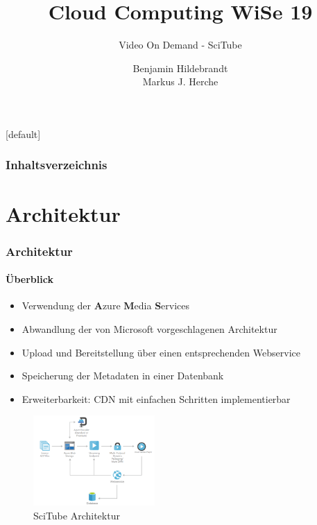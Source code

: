 \documentclass[aspectratio=169]{beamer}
\title[Cloud Computing]{Cloud Computing WiSe 19}
\subtitle{Video On Demand - SciTube}
\author[Hildebrandt, Herche]{Benjamin Hildebrandt \\ Markus J. Herche}
\institute{Fachbereich Angewandte Informatik\\Hoschule Fulda -- University of Applied Sciences}
\begin{document}
\begingroup
{}[default]
\begin{frame}[plain]
  \titlepage
\end{frame}
\endgroup

\begin{frame}
  \frametitle{Inhaltsverzeichnis}
  \tableofcontents
\end{frame}

\section{Architektur}
\begin{frame}
  \frametitle{Architektur}
  \framesubtitle{Überblick}
  \begin{minipage}{.45\textwidth}
    \begin{itemize}
      \item Verwendung der \textbf{A}zure \textbf{M}edia \textbf{S}ervices
      \item Abwandlung der von Microsoft vorgeschlagenen Architektur
      \item Upload und Bereitstellung über einen entsprechenden Webservice
      \item Speicherung der Metadaten in einer Datenbank
      \item Erweiterbarkeit: CDN mit einfachen Schritten implementierbar
    \end{itemize}
  \end{minipage}
  \begin{minipage}{.5\textwidth}
    \begin{figure}[H]
      \includegraphics[height=130px]{img/architecture_new.png}
      \caption{SciTube Architektur}
      \label{fig:arch_new}
    \end{figure}
  \end{minipage}
\end{frame}
\end{document}
